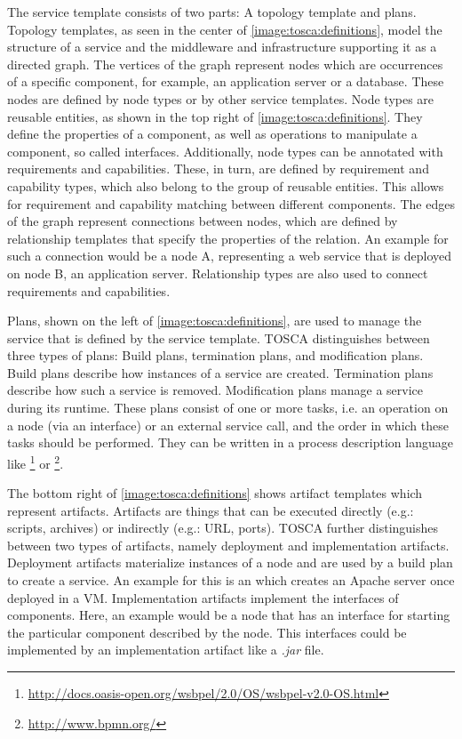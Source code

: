 The service template consists of two parts: A topology template and plans.
Topology templates, as seen in the center of \autoref{image:tosca:definitions}, model the structure of a service and the middleware and infrastructure supporting it as a directed graph.
The vertices of the graph represent nodes which are occurrences of a specific component, for example, an application server or a database.
These nodes are defined by node types or by other service templates.
Node types are reusable entities, as shown in the top right of \autoref{image:tosca:definitions}.
They define the properties of a component, as well as operations to manipulate a component, so called interfaces.
Additionally, node types can be annotated with requirements and capabilities.
These, in turn, are defined by requirement and capability types, which also belong to the group of reusable entities.
This allows for requirement and capability matching between different components.
The edges of the graph represent connections between nodes, which are defined by relationship templates that specify the properties of the relation.
An example for such a connection would be a node A, representing a web service that is deployed on node B, an application server.
Relationship types are also used to connect requirements and capabilities.

Plans, shown on the left of \autoref{image:tosca:definitions}, are used to manage the service that is defined by the service template. TOSCA distinguishes between three types of plans: Build plans, termination plans, and modification plans.
Build plans describe how instances of a service are created.
Termination plans describe how such a service is removed.
Modification plans manage a service during its runtime.
These plans consist of one or more tasks, i.e. an operation on a node (via an interface) or an external service call, and the order in which these tasks should be performed.
They can be written in a process description language like \footnote{\url{http://docs.oasis-open.org/wsbpel/2.0/OS/wsbpel-v2.0-OS.html}} or \footnote{\url{http://www.bpmn.org/}}.

The bottom right of \autoref{image:tosca:definitions} shows artifact templates which represent artifacts.
Artifacts are things that can be executed directly (e.g.: scripts, archives) or indirectly (e.g.: URL, ports).
TOSCA further distinguishes between two types of artifacts, namely deployment and implementation artifacts.
Deployment artifacts materialize instances of a node and are used by a build plan to create a service.
An example for this is an  which creates an Apache server once deployed in a VM.
Implementation artifacts implement the interfaces of components.
Here, an example would be a node that has an interface for starting the particular component described by the node.
This interfaces could be implemented by an implementation artifact like a \textit{.jar} file.

